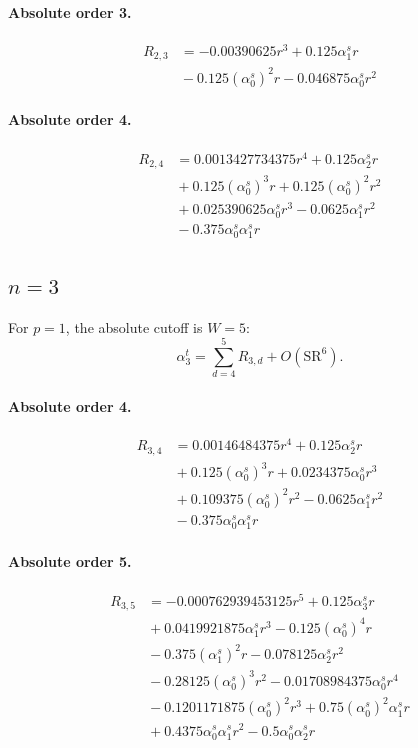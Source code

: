 \documentclass[10pt]{article}
\begin{document}
\paragraph{Absolute order 3.}
\begin{align*}
R_{2,3} &=  - 0.00390625 r^{3} + 0.125 \alpha_{1}^s r \\
&{}  - 0.125 \left(\alpha_{0}^s\right)^{2} r - 0.046875 \alpha_{0}^s r^{2}
\end{align*}

\paragraph{Absolute order 4.}
\begin{align*}
R_{2,4} &= 0.0013427734375 r^{4} + 0.125 \alpha_{2}^s r \\
&{}  + 0.125 \left(\alpha_{0}^s\right)^{3} r + 0.125 \left(\alpha_{0}^s\right)^{2} r^{2} \\
&{}  + 0.025390625 \alpha_{0}^s r^{3} - 0.0625 \alpha_{1}^s r^{2} \\
&{}  - 0.375 \alpha_{0}^s \alpha_{1}^s r
\end{align*}

\subsection{$n=3$}
For $p=1$, the absolute cutoff is $W=5$:
\[\alpha_{3}^t=\sum_{d=4}^{5}R_{3,d}+O(\mathrm{SR}^{6}).\]
\paragraph{Absolute order 4.}
\begin{align*}
R_{3,4} &= 0.00146484375 r^{4} + 0.125 \alpha_{2}^s r \\
&{}  + 0.125 \left(\alpha_{0}^s\right)^{3} r + 0.0234375 \alpha_{0}^s r^{3} \\
&{}  + 0.109375 \left(\alpha_{0}^s\right)^{2} r^{2} - 0.0625 \alpha_{1}^s r^{2} \\
&{}  - 0.375 \alpha_{0}^s \alpha_{1}^s r
\end{align*}

\paragraph{Absolute order 5.}
\begin{align*}
R_{3,5} &=  - 0.000762939453125 r^{5} + 0.125 \alpha_{3}^s r \\
&{}  + 0.0419921875 \alpha_{1}^s r^{3} - 0.125 \left(\alpha_{0}^s\right)^{4} r \\
&{}  - 0.375 \left(\alpha_{1}^s\right)^{2} r - 0.078125 \alpha_{2}^s r^{2} \\
&{}  - 0.28125 \left(\alpha_{0}^s\right)^{3} r^{2} - 0.01708984375 \alpha_{0}^s r^{4} \\
&{}  - 0.1201171875 \left(\alpha_{0}^s\right)^{2} r^{3} + 0.75 \left(\alpha_{0}^s\right)^{2} \alpha_{1}^s r \\
&{}  + 0.4375 \alpha_{0}^s \alpha_{1}^s r^{2} - 0.5 \alpha_{0}^s \alpha_{2}^s r
\end{align*}
\end{document}
